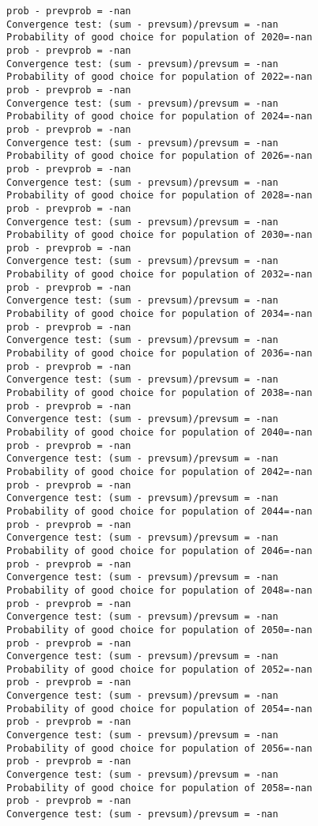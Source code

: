 \documentclass[11pt,onecolumn]{article}
\begin{document}
\begin{verbatim}
prob - prevprob = -nan
Convergence test: (sum - prevsum)/prevsum = -nan
Probability of good choice for population of 2020=-nan
prob - prevprob = -nan
Convergence test: (sum - prevsum)/prevsum = -nan
Probability of good choice for population of 2022=-nan
prob - prevprob = -nan
Convergence test: (sum - prevsum)/prevsum = -nan
Probability of good choice for population of 2024=-nan
prob - prevprob = -nan
Convergence test: (sum - prevsum)/prevsum = -nan
Probability of good choice for population of 2026=-nan
prob - prevprob = -nan
Convergence test: (sum - prevsum)/prevsum = -nan
Probability of good choice for population of 2028=-nan
prob - prevprob = -nan
Convergence test: (sum - prevsum)/prevsum = -nan
Probability of good choice for population of 2030=-nan
prob - prevprob = -nan
Convergence test: (sum - prevsum)/prevsum = -nan
Probability of good choice for population of 2032=-nan
prob - prevprob = -nan
Convergence test: (sum - prevsum)/prevsum = -nan
Probability of good choice for population of 2034=-nan
prob - prevprob = -nan
Convergence test: (sum - prevsum)/prevsum = -nan
Probability of good choice for population of 2036=-nan
prob - prevprob = -nan
Convergence test: (sum - prevsum)/prevsum = -nan
Probability of good choice for population of 2038=-nan
prob - prevprob = -nan
Convergence test: (sum - prevsum)/prevsum = -nan
Probability of good choice for population of 2040=-nan
prob - prevprob = -nan
Convergence test: (sum - prevsum)/prevsum = -nan
Probability of good choice for population of 2042=-nan
prob - prevprob = -nan
Convergence test: (sum - prevsum)/prevsum = -nan
Probability of good choice for population of 2044=-nan
prob - prevprob = -nan
Convergence test: (sum - prevsum)/prevsum = -nan
Probability of good choice for population of 2046=-nan
prob - prevprob = -nan
Convergence test: (sum - prevsum)/prevsum = -nan
Probability of good choice for population of 2048=-nan
prob - prevprob = -nan
Convergence test: (sum - prevsum)/prevsum = -nan
Probability of good choice for population of 2050=-nan
prob - prevprob = -nan
Convergence test: (sum - prevsum)/prevsum = -nan
Probability of good choice for population of 2052=-nan
prob - prevprob = -nan
Convergence test: (sum - prevsum)/prevsum = -nan
Probability of good choice for population of 2054=-nan
prob - prevprob = -nan
Convergence test: (sum - prevsum)/prevsum = -nan
Probability of good choice for population of 2056=-nan
prob - prevprob = -nan
Convergence test: (sum - prevsum)/prevsum = -nan
Probability of good choice for population of 2058=-nan
prob - prevprob = -nan
Convergence test: (sum - prevsum)/prevsum = -nan

\end{verbatim}
\end{document}
